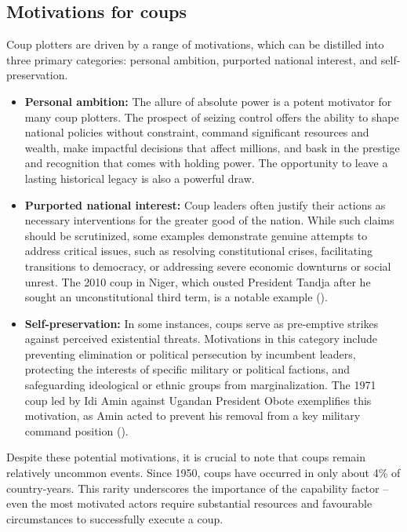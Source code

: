 \documentclass[
  12pt,
]{report}
\begin{document}
\subsection{Motivations for coups}\label{motivations-for-coups}

Coup plotters are driven by a range of motivations, which can be
distilled into three primary categories: personal ambition, purported
national interest, and self-preservation.

\begin{itemize}
\item
  \textbf{Personal ambition:} The allure of absolute power is a potent
  motivator for many coup plotters. The prospect of seizing control
  offers the ability to shape national policies without constraint,
  command significant resources and wealth, make impactful decisions
  that affect millions, and bask in the prestige and recognition that
  comes with holding power. The opportunity to leave a lasting
  historical legacy is also a powerful draw.
\item
  \textbf{Purported national interest:} Coup leaders often justify their
  actions as necessary interventions for the greater good of the nation.
  While such claims should be scrutinized, some examples demonstrate
  genuine attempts to address critical issues, such as resolving
  constitutional crises, facilitating transitions to democracy, or
  addressing severe economic downturns or social unrest. The 2010 coup
  in Niger, which ousted President Tandja after he sought an
  unconstitutional third term, is a notable example
  ().
\item
  \textbf{Self-preservation:} In some instances, coups serve as
  pre-emptive strikes against perceived existential threats. Motivations
  in this category include preventing elimination or political
  persecution by incumbent leaders, protecting the interests of specific
  military or political factions, and safeguarding ideological or ethnic
  groups from marginalization. The 1971 coup led by Idi Amin against
  Ugandan President Obote exemplifies this motivation, as Amin acted to
  prevent his removal from a key military command position
  ().
\end{itemize}

Despite these potential motivations, it is crucial to note that coups
remain relatively uncommon events. Since 1950, coups have occurred in
only about 4\% of country-years. This rarity underscores the importance
of the capability factor -- even the most motivated actors require
substantial resources and favourable circumstances to successfully
execute a coup.
\end{document}
